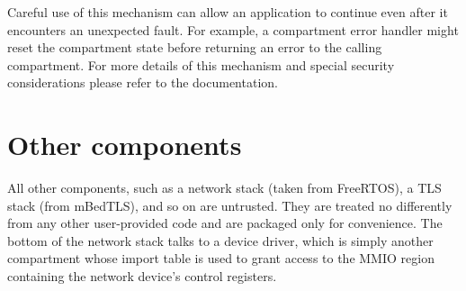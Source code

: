 Careful use of this mechanism can allow an application to continue even after it encounters an unexpected fault.
For example, a compartment error handler might reset the compartment state before returning an error to the calling compartment.
For more details of this mechanism and special security considerations please refer to the \cherimcuos{} documentation.

\section{Other components}

All other components, such as a network stack (taken from FreeRTOS), a TLS stack (from mBedTLS), and so on are untrusted.
They are treated no differently from any other user-provided code and are packaged only for convenience.
The bottom of the network stack talks to a device driver, which is simply another compartment whose import table is used to grant access to the MMIO region containing the network device's control registers.

